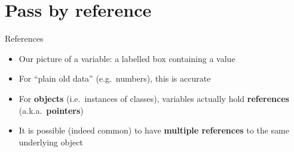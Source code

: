 \newcommand{\socrative}{
	\begin{center}
		Socrative room code: \texttt{FALCOMPED}
	\end{center}
}

\newcommand{\codeslide}[2]{
	\begin{columns}
		\begin{column}{0.58\textwidth}
			
		\end{column}
		\pause
		\begin{column}{0.38\textwidth}
			\begin{center}
				\colorbox{white}{
					\color{black}
					\begin{tabular}{|c|c|}
						\hline
						\textbf{Variable} & \textbf{Value} \\\hline
						#2
					\end{tabular}
				}
			\end{center}
		\end{column}
	\end{columns}
}

\newcommand{\trow}[1]{ & \\ \texttt{#1} & \\ & \\\hline}

\part{Pass by reference}
\frame{\partpage}

\begin{frame}{References}
	\begin{itemize}
		\pause\item Our picture of a variable: a labelled box containing a value
		\pause\item For ``plain old data'' (e.g.\ numbers), this is accurate
		\pause\item For \textbf{objects} (i.e.\ instances of classes), variables actually hold
			\textbf{references} (a.k.a.\ \textbf{pointers})
		\pause\item It is possible (indeed common) to have \textbf{multiple references} to the same underlying object
	\end{itemize}
\end{frame}

